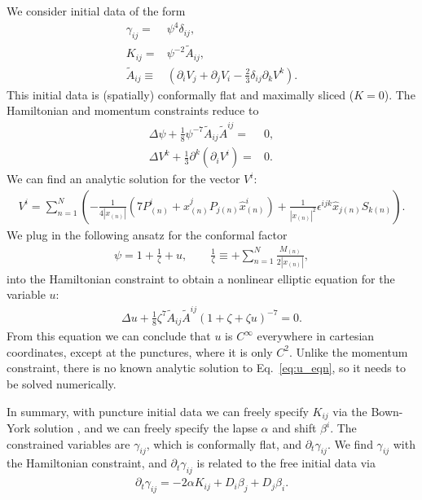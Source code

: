 \documentclass[%
notitlepage,
report,
nofootinbib,
 amsmath,amssymb,
 aps,
]{revtex4-1}
\begin{document}
We consider initial data of the form
\begin{subequations}
\begin{align}
   \gamma_{ij}
   =&
   \psi^4\delta_{ij}
   ,\\
   K_{ij}
   =&
   \psi^{-2}
   \tilde{A}_{ij}
   ,\\
   \tilde{A}_{ij}
   \equiv&
   \left(
      \partial_iV_j
   +  \partial_jV_i
   -  \frac{2}{3}\delta_{ij}\partial_kV^k
   \right)
   .
\end{align}
\end{subequations}
This initial data is (spatially)
conformally flat and maximally sliced ($K=0$).
The Hamiltonian and momentum constraints reduce to
\begin{align}
   \Delta \psi
   +  \frac{1}{8}\psi^{-7}\tilde{A}_{ij}\tilde{A}^{ij}
   =&
   0
   ,\\
   \Delta V^k
+  \frac{1}{3}\partial^k \left(\partial_iV^i\right)
   =&
   0
   .
\end{align}
   We can find an analytic solution for the vector $V^i$: 
\begin{align}
\label{eq:Bowen_York_sol}
   V^i
   =
   \sum_{n=1}^N
   \left(
   -  \frac{1}{4|x_{(n)}|}\left(
         7P_{(n)}^i
      +  \hat{x}^j_{(n)} P_{j(n)}\hat{x}_{(n)}^i
      \right)
   +  \frac{1}{| x_{(n)} |^2}
      \epsilon^{ijk}\hat{x}_{j(n)}S_{k(n)}
   \right)
   .
\end{align} 
We plug in the following ansatz for the conformal factor
\begin{align}
   \psi
   =
   1
   +  \frac{1}{\zeta}
   +  u
   ,\qquad
   \frac{1}{\zeta}
   \equiv
+  \sum_{n=1}^N\frac{M_{(n)}}{2|x_{(n)}|}
   ,
\end{align} 
into the Hamiltonian constraint to obtain a nonlinear elliptic
equation for the variable $u$:
\begin{align}
\label{eq:u_eqn}
   \Delta u 
   + 
   \frac{1}{8}\zeta^7\tilde{A}_{ij}\tilde{A}^{ij}
   \left(1+\zeta+\zeta u\right)^{-7}
   =
   0
   .
\end{align}
From this equation we can conclude that $u$ is $C^{\infty}$ everywhere
in cartesian coordinates, except at the punctures, where it is only $C^2$.
Unlike the momentum constraint, there is no known analytic
solution to Eq.~\eqref{eq:u_eqn}, so it needs to be solved numerically.

In summary, with puncture initial data we can freely specify
$K_{ij}$ via the Bown-York solution \cite{eq:Bowen_York_sol},
and we can freely specify the lapse $\alpha$ and shift $\beta^i$.
The constrained variables are $\gamma_{ij}$, which is
conformally flat, and $\partial_t\gamma_{ij}$.
We find $\gamma_{ij}$ with the Hamiltonian constraint,
and $\partial_t\gamma_{ij}$ is related to the free initial data via
\begin{align}
   \partial_t\gamma_{ij}
   =
   -
   2\alpha K_{ij}
   +
   D_i\beta_j
   +
   D_j\beta_i
   .
\end{align}
\end{document}

